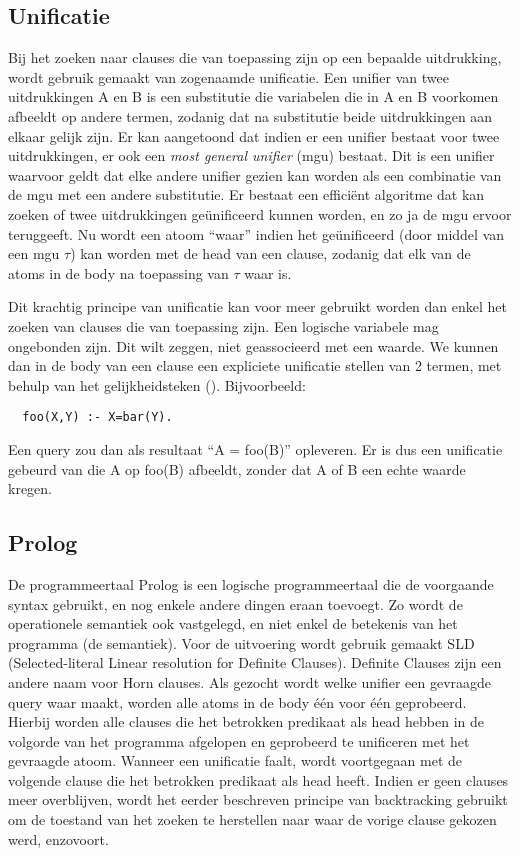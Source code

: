 \subsection{Unificatie}
Bij het zoeken naar clauses die van toepassing zijn op een bepaalde uitdrukking, wordt gebruik gemaakt van zogenaamde unificatie. Een unifier van twee uitdrukkingen A en B is een substitutie die variabelen die in A en B voorkomen afbeeldt op andere termen, zodanig dat na substitutie beide uitdrukkingen aan elkaar gelijk zijn. Er kan aangetoond dat indien er een unifier bestaat voor twee uitdrukkingen, er ook een {\em most general unifier} (mgu) bestaat. Dit is een unifier waarvoor geldt dat elke andere unifier gezien kan worden als een combinatie van de mgu met een andere substitutie. Er bestaat een effici\"ent algoritme dat kan zoeken of twee uitdrukkingen ge\"unificeerd kunnen worden, en zo ja de mgu ervoor teruggeeft. Nu wordt een atoom ``waar'' indien het ge\"unificeerd (door middel van een mgu $\tau$) kan worden met de head van een clause, zodanig dat elk van de atoms in de body na toepassing van $\tau$ waar is.

Dit krachtig principe van unificatie kan voor meer gebruikt worden dan enkel het zoeken van clauses die van toepassing zijn. Een logische variabele mag ongebonden zijn. Dit wilt zeggen, niet geassocieerd met een waarde. We kunnen dan in de body van een clause een expliciete unificatie stellen van 2 termen, met behulp van het gelijkheidsteken (\code{=}). Bijvoorbeeld: \begin{Verbatim}
  foo(X,Y) :- X=bar(Y).
\end{Verbatim}
Een query  zou dan als resultaat ``A = foo(B)'' opleveren. Er is dus een unificatie gebeurd van die A op foo(B) afbeeldt, zonder dat A of B een echte waarde kregen.

\subsection{Prolog}
De programmeertaal Prolog is een logische programmeertaal die de voorgaande syntax gebruikt, en nog enkele andere dingen eraan toevoegt. Zo wordt de operationele semantiek ook vastgelegd, en niet enkel de betekenis van het programma (de semantiek). Voor de uitvoering wordt gebruik gemaakt SLD (Selected-literal Linear resolution for Definite Clauses). Definite Clauses zijn een andere naam voor Horn clauses. Als gezocht wordt welke unifier een gevraagde query waar maakt, worden alle atoms in de body \'e\'en voor \'e\'en geprobeerd. Hierbij worden alle clauses die het betrokken predikaat als head hebben in de volgorde van het programma afgelopen en geprobeerd te unificeren met het gevraagde atoom. Wanneer een unificatie faalt, wordt voortgegaan met de volgende clause die het betrokken predikaat als head heeft. Indien er geen clauses meer overblijven, wordt het eerder beschreven principe van backtracking gebruikt om de toestand van het zoeken te herstellen naar waar de vorige clause gekozen werd, enzovoort.


